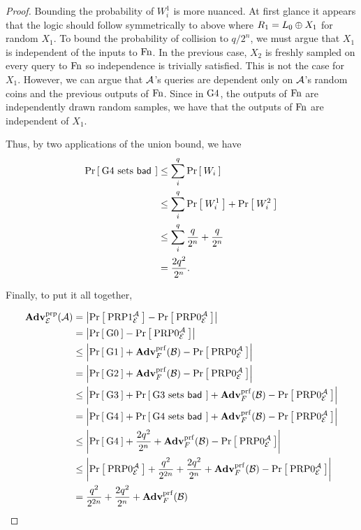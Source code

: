 \begin{proof}
Bounding the probability of $W_i^1$ is more nuanced.
At first glance it appears that the logic should follow symmetrically to above where $R_1 = L_0\xor X_1$ for random $X_1$.
To bound the probability of collision to $q/2^n$, we must argue that $X_1$ is independent of the inputs to $\Fn$.
In the previous case, $X_2$ is freshly sampled on every query to $\Fn$ so independence is trivially satisfied.
This is not the case for $X_1$.
However, we can argue that $\advA$'s queries are dependent only on $\advA$'s random coins and the previous outputs of $\Fn$.
Since in $\G4$, the outputs of $\Fn$ are independently drawn random samples, we have that the outputs of $\Fn$ are independent of $X_1$.

Thus, by two applications of the union bound, we have
\begin{align*}
  \Prob{\G4 \setsbad} &\le \sum_i^q \Prob{W_i}\\
  &\le \sum_i^q \Prob{W_i^1} + \Prob{W_i^2}\\
  &\le \sum_i^q \frac{q}{2^n} + \frac{q}{2^n}\\
  &= \frac{2q^2}{2^n}.
\end{align*}

Finally, to put it all together,

\begin{align*}
\AdvPRP{\Feistel}{\advA}
    &=\left|\Prob{\PRP1^\advA_\Feistel} - \Prob{\PRP0^\advA_\Feistel}\right|\\
    &= \left|\Prob{\G0} - \Prob{\PRP0^\advA_\cipher}\right|\\
    &\le \left|\Prob{\G1} + \AdvPRF{F}{\advB} - \Prob{\PRP0^\advA_\cipher}\right|\\
    &=   \left|\Prob{\G2} + \AdvPRF{F}{\advB} - \Prob{\PRP0^\advA_\cipher}\right|\\
    &\le \left|\Prob{\G3} + \Prob{\G3\setsbad} + \AdvPRF{F}{\advB} - \Prob{\PRP0^\advA_\cipher}\right|\\
    &= \left|\Prob{\G4} + \Prob{\G4\setsbad} + \AdvPRF{F}{\advB} - \Prob{\PRP0^\advA_\cipher}\right|\\
    &\le \left|\Prob{\G4} + \frac{2q^2}{2^n} + \AdvPRF{F}{\advB} - \Prob{\PRP0^\advA_\cipher}\right|\\
    &\le \left|\Prob{\PRP0^\advA_\cipher} + \frac{q^2}{2^{2n}} + \frac{2q^2}{2^n} + \AdvPRF{F}{\advB} - \Prob{\PRP0^\advA_\cipher}\right|\\
    &= \frac{q^2}{2^{2n}} + \frac{2q^2}{2^n} + \AdvPRF{F}{\advB}\\
\end{align*}

\end{proof}

